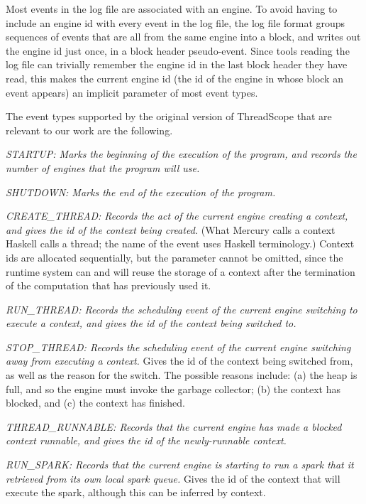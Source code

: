 Most events in the log file are associated with an engine.
To avoid having to include an engine id with every event in the log file,
the log file format
groups sequences of events that are all from the same engine into a block,
and writes out the engine id just once, in a block header pseudo-event.
Since tools reading the log file can trivially remember
the engine id in the last block header they have read,
this makes the current engine id
(the id of the engine in whose block an event appears)
an implicit parameter of most event types.

The event types supported by the original version of ThreadScope 
that are relevant to our work are the following.

\emph{STARTUP:
Marks the beginning of the execution of the program,
and records the number of engines that the program will use.}

\emph{SHUTDOWN:
Marks the end of the execution of the program.}

\emph{CREATE\_THREAD:
Records the act of the current engine creating a context,
and gives the id of the context being created.}
(What Mercury calls a context Haskell calls a thread;
the name of the event uses Haskell terminology.)
Context ids are allocated sequentially,
but the parameter cannot be omitted,
since the runtime system can and will reuse the storage of a context
after the termination of the computation that has previously used it.

\emph{RUN\_THREAD:
Records the scheduling event
of the current engine switching to execute a context,
and gives the id of the context being switched to.}

\emph{STOP\_THREAD:
Records the scheduling event
of the current engine switching away from executing a context.}
Gives the id of the context being switched from,
as well as the reason for the switch.
The possible reasons include:
(a) the heap is full, and so the engine must invoke the garbage collector;
(b) the context has blocked, and
(c) the context has finished.

\emph{THREAD\_RUNNABLE:
Records that the current engine has made a blocked context runnable,
and gives the id of the newly-runnable context.}

\emph{RUN\_SPARK:
Records that the current engine is starting to run a spark
that it retrieved from its own local spark queue.}
Gives the id of the context that will execute the spark,
although this can be inferred by context.

